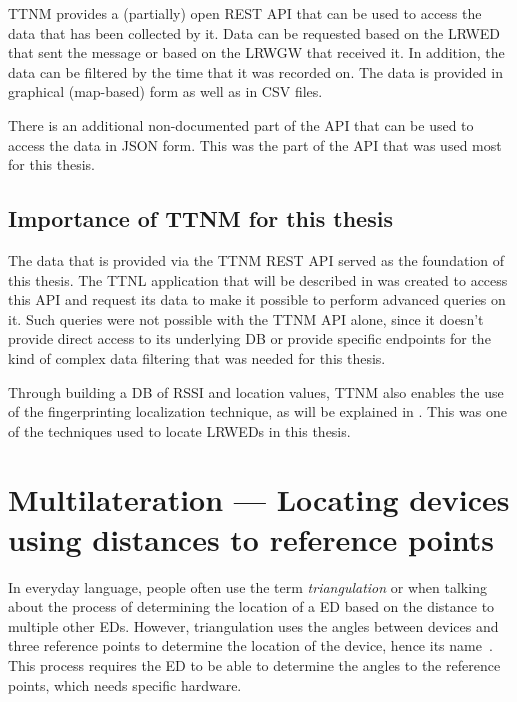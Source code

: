 \ac{TTNM} provides a (partially) open \ac{REST} \ac{API} that can be used to access the data that has been collected by it.
Data can be requested based on the \acl{LRWED} that sent the message or based on the \acl{LRWGW} that received it.
In addition, the data can be filtered by the time that it was recorded on.
The data is provided in graphical (map-based) form as well as in \ac{CSV} files.

There is an additional non-documented part of the \ac{API} that can be used to access the data in \ac{JSON} form.
This was the part of the \ac{API} that was used most for this thesis.

\subsection{Importance of \acl{TTNM} for this thesis}\label{sec:ttn-mapper-importance}

The data that is provided via the \ac{TTNM} \ac{REST} \ac{API} served as the foundation of this thesis.
The \ac{TTNL} application that will be described in  was created to access this \ac{API} and request its data to make it possible to perform advanced queries on it.
Such queries were not possible with the \ac{TTNM} \ac{API} alone, since it doesn't provide direct access to its underlying \ac{DB} or provide specific endpoints for the kind of complex data filtering that was needed for this thesis.

Through building a \ac{DB} of \ac{RSSI} and location values, \ac{TTNM} also enables the use of the fingerprinting localization technique, as will be explained in .
This was one of the techniques used to locate \aclp{LRWED} in this thesis.

\section{Multilateration — Locating devices using distances to reference points}\label{sec:multilateration-basics}

In everyday language, people often use the term \emph{triangulation} or when talking about the process of determining the location of a \acl{ED} based on the distance to multiple other \aclp{ED}.
However, triangulation uses the angles between devices and three reference points to determine the location of the device, hence its name~\cite{yaro_multiangulation_2017}.
This process requires the \acl{ED} to be able to determine the angles to the reference points, which needs specific hardware.

